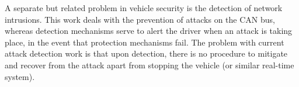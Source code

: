 A separate but related problem in vehicle security is the detection of network intrusions. This work deals with the prevention of attacks on the CAN bus, whereas detection mechanisms serve to alert the driver when an attack is taking place, in the event that protection mechanisms fail. The problem with current attack detection work is that upon detection, there is no procedure to mitigate and recover from the attack apart from stopping the vehicle (or similar real-time system).

